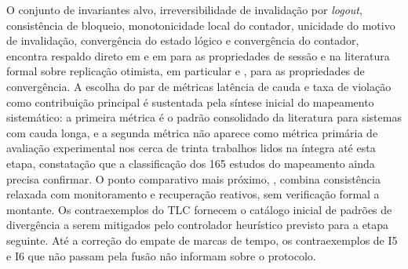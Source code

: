 O conjunto de invariantes alvo, irreversibilidade de invalidação por \emph{logout}, consistência de bloqueio, monotonicidade local do contador, unicidade do motivo de invalidação, convergência do estado lógico e convergência do contador, encontra respaldo direto em \citet{nist_sp_800_63b4_2025} e em \citet{owasp_session_mgmt_cheatsheet} para as propriedades de sessão e na literatura formal sobre replicação otimista, em particular \citet{shapiro_crdt_2011} e \citet{nair_safety_distributed_2020}, para as propriedades de convergência. A escolha do par de métricas latência de cauda e taxa de violação como contribuição principal é sustentada pela síntese inicial do mapeamento sistemático: a primeira métrica é o padrão consolidado da literatura para sistemas com cauda longa, e a segunda métrica não aparece como métrica primária de avaliação experimental nos cerca de trinta trabalhos lidos na íntegra até esta etapa, constatação que a classificação dos 165 estudos do mapeamento ainda precisa confirmar. O ponto comparativo mais próximo, \citet{nguyen_weaker_consistency_2019}, combina consistência relaxada com monitoramento e recuperação reativos, sem verificação formal a montante. Os contraexemplos do TLC fornecem o catálogo inicial de padrões de divergência a serem mitigados pelo controlador heurístico previsto para a etapa seguinte. Até a correção do empate de marcas de tempo, os contraexemplos de I5 e I6 que não passam pela fusão não informam sobre o protocolo.


